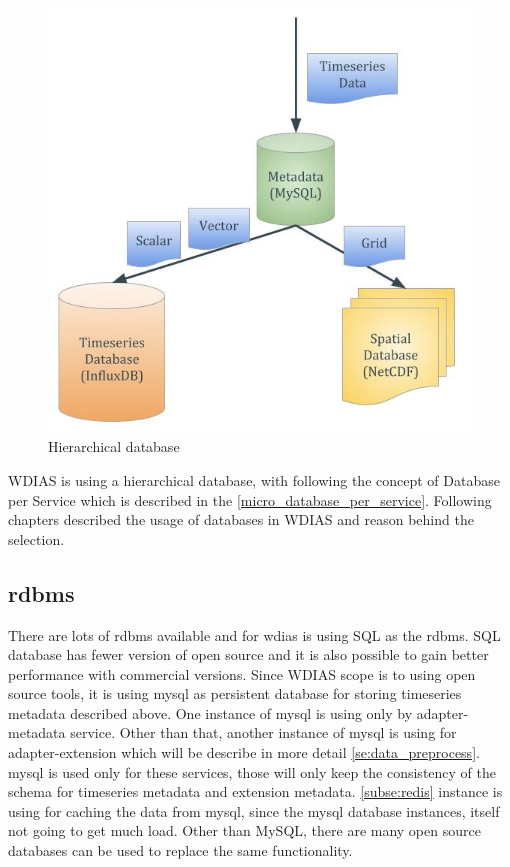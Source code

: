 \begin{figure}[htp]
    \centering
    \includegraphics[width=1\textwidth]{method/microservice/hierarchical_database.jpg}
    \caption{Hierarchical database}
    \label{fi:hierarchical_database}
\end{figure}

WDIAS is using a hierarchical database, with following the concept of Database per Service which is described in the \ref{micro_database_per_service}.
Following chapters described the usage of databases in WDIAS and reason behind the selection.

\subsection{\acrshort{rdbms}}
\label{subse:mysql}

There are lots of \acrshort{rdbms} available and for \acrshort{wdias} is using SQL as the \acrfull{rdbms}.
SQL database has fewer version of open source and it is also possible to gain better performance with commercial versions. 
Since WDIAS scope is to using open source tools, it is using \acrshort{mysql} as persistent database for storing timeseries metadata described above.
One instance of \acrshort{mysql} is using only by adapter-metadata service.
Other than that, another instance of \acrshort{mysql} is using for adapter-extension which will be describe in more detail \ref{se:data_preprocess}.
\acrshort{mysql} is used only for these services, those will only keep the consistency of the schema for timeseries metadata and extension metadata.
\ref{subse:redis} instance is using for caching the data from \acrshort{mysql}, since the \acrshort{mysql} database instances, itself not going to get much load.
Other than MySQL, there are many open source databases can be used to replace the same functionality.

